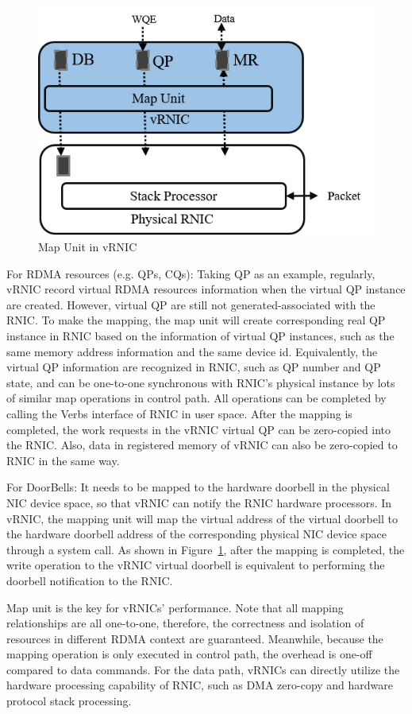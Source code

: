 \begin{figure}[!ht]
	\centering
	\includegraphics[width=0.9\linewidth]{images/map-unit}
	\caption{Map Unit in vRNIC}
	\label{fig:map-unit}
\end{figure}

For RDMA resources (e.g. QPs, CQs): Taking QP as an example, regularly, vRNIC record virtual RDMA resources information when the virtual QP instance are created. However, virtual QP are still not generated-associated with the RNIC. To make the mapping, the map unit will create corresponding real QP instance in RNIC based on the information of virtual QP instances, such as the same memory address information and the same device id. Equivalently, the virtual QP information are recognized in RNIC, such as QP number and QP state, and can be one-to-one synchronous with RNIC’s physical instance by lots of similar map operations in control path. All operations can be completed by calling the Verbs interface of RNIC in user space. After the mapping is completed, the work requests in the vRNIC virtual QP can be zero-copied into the RNIC. Also, data in registered memory of vRNIC can also be zero-copied to RNIC in the same way. 

For DoorBells: It needs to be mapped to the hardware doorbell in the physical NIC device space, so that vRNIC can notify the RNIC hardware processors. In vRNIC, the mapping unit will map the virtual address of the virtual doorbell to the hardware doorbell address of the corresponding physical NIC device space through a system call. As shown in Figure~\ref{fig:map-unit}, after the mapping is completed, the write operation to the vRNIC virtual doorbell is equivalent to performing the doorbell notification to the RNIC.

Map unit is the key for vRNICs' performance. Note that all mapping relationships are all one-to-one, therefore, the correctness and isolation of resources in different RDMA context are guaranteed. Meanwhile, because the mapping operation is only executed in control path, the overhead is one-off compared to data commands. For the data path, vRNICs can directly utilize the hardware processing capability of RNIC, such as DMA zero-copy and hardware protocol stack processing.

